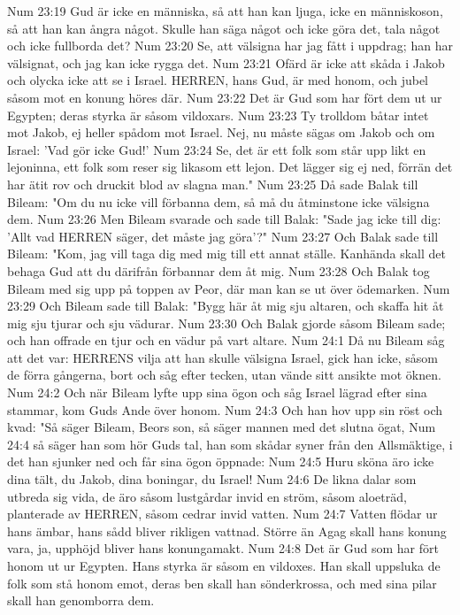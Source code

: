 Num 23:19  Gud är icke en människa, så att han kan ljuga, icke en människoson, så att han kan ångra något. Skulle han säga något och icke göra det, tala något och icke fullborda det?
Num 23:20  Se, att välsigna har jag fått i uppdrag; han har välsignat, och jag kan icke rygga det.
Num 23:21  Ofärd är icke att skåda i Jakob och olycka icke att se i Israel. HERREN, hans Gud, är med honom, och jubel såsom mot en konung höres där.
Num 23:22  Det är Gud som har fört dem ut ur Egypten; deras styrka är såsom vildoxars.
Num 23:23  Ty trolldom båtar intet mot Jakob, ej heller spådom mot Israel. Nej, nu måste sägas om Jakob och om Israel: 'Vad gör icke Gud!'
Num 23:24  Se, det är ett folk som står upp likt en lejoninna, ett folk som reser sig likasom ett lejon. Det lägger sig ej ned, förrän det har ätit rov och druckit blod av slagna man."
Num 23:25  Då sade Balak till Bileam: "Om du nu icke vill förbanna dem, så må du åtminstone icke välsigna dem.
Num 23:26  Men Bileam svarade och sade till Balak: "Sade jag icke till dig: 'Allt vad HERREN säger, det måste jag göra'?"
Num 23:27  Och Balak sade till Bileam: "Kom, jag vill taga dig med mig till ett annat ställe. Kanhända skall det behaga Gud att du därifrån förbannar dem åt mig.
Num 23:28  Och Balak tog Bileam med sig upp på toppen av Peor, där man kan se ut över ödemarken.
Num 23:29  Och Bileam sade till Balak: "Bygg här åt mig sju altaren, och skaffa hit åt mig sju tjurar och sju vädurar.
Num 23:30  Och Balak gjorde såsom Bileam sade; och han offrade en tjur och en vädur på vart altare.
Num 24:1  Då nu Bileam såg att det var: HERRENS vilja att han skulle välsigna Israel, gick han icke, såsom de förra gångerna, bort och såg efter tecken, utan vände sitt ansikte mot öknen.
Num 24:2  Och när Bileam lyfte upp sina ögon och såg Israel lägrad efter sina stammar, kom Guds Ande över honom.
Num 24:3  Och han hov upp sin röst och kvad: "Så säger Bileam, Beors son, så säger mannen med det slutna ögat,
Num 24:4  så säger han som hör Guds tal, han som skådar syner från den Allsmäktige, i det han sjunker ned och får sina ögon öppnade:
Num 24:5  Huru sköna äro icke dina tält, du Jakob, dina boningar, du Israel!
Num 24:6  De likna dalar som utbreda sig vida, de äro såsom lustgårdar invid en ström, såsom aloeträd, planterade av HERREN, såsom cedrar invid vatten.
Num 24:7  Vatten flödar ur hans ämbar, hans sådd bliver rikligen vattnad. Större än Agag skall hans konung vara, ja, upphöjd bliver hans konungamakt.
Num 24:8  Det är Gud som har fört honom ut ur Egypten. Hans styrka är såsom en vildoxes. Han skall uppsluka de folk som stå honom emot, deras ben skall han sönderkrossa, och med sina pilar skall han genomborra dem.
